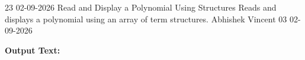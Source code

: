 \clearpage
\label{prog:23}
\programhead
  {23}
  {02-09-2026}
  {Read and Display a Polynomial Using Structures}
  {Reads and displays a polynomial using an array of term structures.}
  {Abhishek Vincent}
  {03}
  {02-09-2026}

\divider
\textbf{Output Text:}\par
\vspace{2pt}

